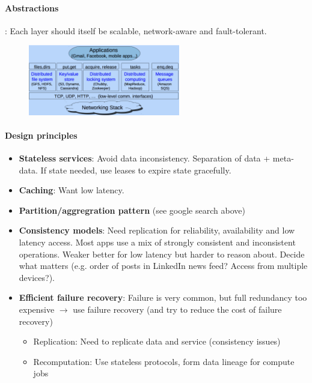\paragraph{Abstractions}: Each layer should itself be scalable, network-aware and fault-tolerant.
\begin{figure}[h]
  \centering
    \includegraphics[width=0.59\textwidth]{img/abstraction.png}
\end{figure}

\paragraph{Design principles}
\begin{itemize}
\item \textbf{Stateless services}: Avoid data inconsistency. Separation of data +
  meta-data. If state needed, use leases to expire state gracefully.
\item \textbf{Caching}: Want low latency.
\item \textbf{Partition/aggregration pattern} (see google search above)
\item \textbf{Consistency models}: Need replication for reliability,  
  availability and low latency access. Most apps use a mix of strongly consistent and inconsistent operations. Weaker better for low latency but harder to reason about. Decide what matters (e.g. order of posts
  in LinkedIn news feed? Access from multiple devices?). 
\item \textbf{Efficient failure recovery}: Failure is very common, but full redundancy
  too expensive $\rightarrow$ use failure recovery (and try to reduce the cost of failure recovery)
  \begin{itemize}
    \item Replication: Need to replicate data and service (consistency issues)
      \item Recomputation: Use stateless protocols, form data lineage for compute jobs
  \end{itemize}
\end{itemize}